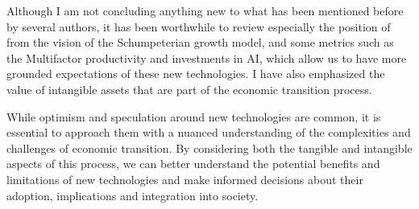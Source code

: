 \documentclass[preprint, 1p,
authoryear]{elsarticle} %
\begin{document}
Although I am not concluding anything new to what has been mentioned
before by several authors, it has been worthwhile to review especially
the position of \citep{paradox} from the vision of the Schumpeterian
growth model, and some metrics such as the Multifactor productivity and
investments in AI, which allow us to have more grounded expectations of
these new technologies. I have also emphasized the value of intangible
assets that are part of the economic transition process.

While optimism and speculation around new technologies are common, it is
essential to approach them with a nuanced understanding of the
complexities and challenges of economic transition. By considering both
the tangible and intangible aspects of this process, we can better
understand the potential benefits and limitations of new technologies
and make informed decisions about their adoption, implications and
integration into society.

\renewcommand\refname{References}

\end{document}
